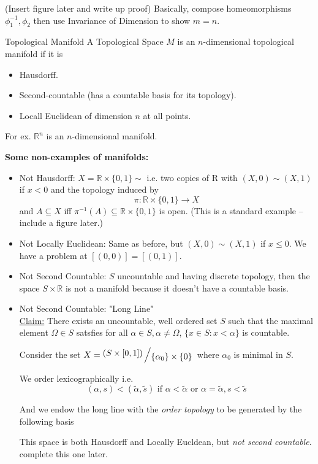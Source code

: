 \documentclass{article}
\newcommand{\bigslant}[2]{{\raisebox{.2em}{$#1$}\left/\raisebox{-.2em}{$#2$}\right.}}
\begin{document}
(Insert figure later and write up proof)
Basically, compose homeomorphisms $\phi_1^{-1}, \phi_2$ then use Invariance of Dimension to show $m = n$.

\vskip 0.5cm
\begin{mathdefinitionbox}{Topological Manifold}
  \vskip 0.25cm
  A Topological Space $M$ is an $n$-dimensional topological manifold if it is
  \begin{itemize}
    \item Hausdorff.
    \item Second-countable (has a countable basis for its topology).
    \item Locall Euclidean of dimension $n$ at all points.
  \end{itemize}
  \vskip 0.5cm
  For ex. $\mathbb{R}^{n}$ is an $n$-dimensional manifold. 
\end{mathdefinitionbox}

\vskip 0.5cm

\textbf{Some non-examples of manifolds:} 
\begin{itemize}
  \item Not Hausdorff: $X = \mathbb{R} \times \{0, 1\} \sim $ i.e. two copies of R with $(X, 0) \sim (X, 1)$ if $x < 0$ and the topology induced by 
  \[ \pi : \mathbb{R} \times \{0, 1\} \rightarrow X \] and $A \subseteq X$ iff $\pi^{-1}(A) \subseteq \mathbb{R} \times \{0, 1\}$ is open.
  (This is a standard example -- include a figure later.)

  \item Not Locally Euclidean: Same as before, but $(X, 0) \sim (X, 1)$ if $x \leq 0$. We have a problem at $[(0, 0)] = [(0, 1)]$.

  \item Not Second Countable: $S$ uncountable and having discrete topology, then the space $S \times \mathbb{R}$ is not a manifold because it doesn't have a countable basis. 
  
  \item Not Second Countable: "Long Line" \\
  \underline{Claim:} There exists an uncountable, well ordered set $S$ such that the maximal element $\Omega \in S$ satsfies for all $\alpha \in S, \alpha \neq \Omega$, $\{ x \in S : x < \alpha \}$ is countable. 
  
  Consider the set $X = \bigslant{(S \times [0, 1])}{\{ \alpha_0 \} \times \{ 0 \}}$ where $\alpha_0$ is minimal in $S$.

  We order lexicographically i.e.
  \[ (\alpha, s) < (\tilde{\alpha}, \tilde{s}) \text{  if  } \alpha < \tilde{\alpha} \text{ or } \alpha = \tilde{\alpha}, s < \tilde{s} \]

  And we endow the long line with the \emph{order topology} to be generated by the following basis 
  \[  \]

  This space is both Hausdorff and Locally Eucldean, but \emph{not second countable}.
  complete this one later.
\end{itemize}
\end{document}
